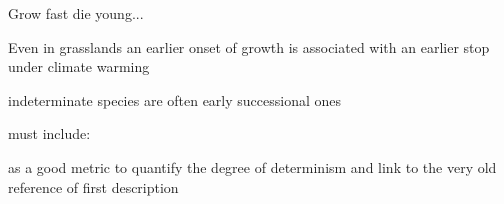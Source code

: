 \documentclass{article}
\begin{document}
 Grow fast die young...
 
 Even in grasslands an earlier onset of growth is associated with an earlier stop under climate warming \cite{mohlGrowthAlpineGrassland2022a}
	
indeterminate species are often early successional ones \citep{marksRelationExtensionGrowth1975, boojhGrowthStrategyTrees1982}

	
	must include: 
	
	\cite{iwasaOptimalGrowthSchedule1989}
	
	\cite{damascosBudCompositionBranching2005} as a good metric to quantify the degree of determinism and link to the very old reference of first description \cite{mooreStudyWinterBuds1909}
	
	
	
	\newpage
	
	
	
	
	
	
\end{document}
